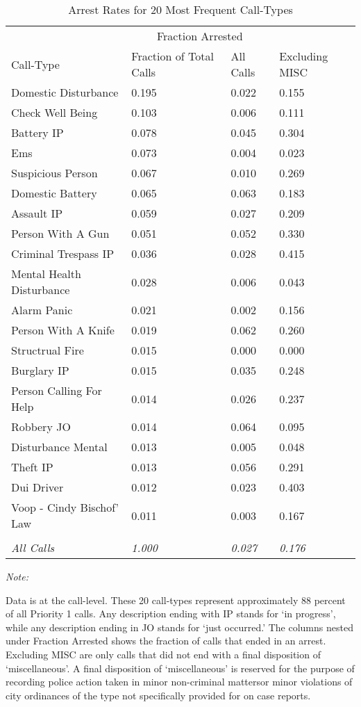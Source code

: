 \begin{table}
\centering
\caption{\label{referee_arrest_rates}Arrest Rates for 20 Most Frequent Call-Types}
\centering
\begin{threeparttable}
\begin{tabular}[t]{>{\raggedright\arraybackslash}p{6cm}lll}
\toprule
\multicolumn{2}{c}{ } & \multicolumn{2}{c}{Fraction Arrested} \\
\cmidrule(l{3pt}r{3pt}){3-4}
Call-Type & Fraction of Total Calls & All Calls & Excluding MISC\\
\midrule
Domestic Disturbance & 0.195 & 0.022 & 0.155\\
Check Well Being & 0.103 & 0.006 & 0.111\\
Battery IP & 0.078 & 0.045 & 0.304\\
Ems & 0.073 & 0.004 & 0.023\\
Suspicious Person & 0.067 & 0.010 & 0.269\\
Domestic Battery & 0.065 & 0.063 & 0.183\\
Assault IP & 0.059 & 0.027 & 0.209\\
Person With A Gun & 0.051 & 0.052 & 0.330\\
Criminal Trespass IP & 0.036 & 0.028 & 0.415\\
Mental Health Disturbance & 0.028 & 0.006 & 0.043\\
Alarm Panic & 0.021 & 0.002 & 0.156\\
Person With A Knife & 0.019 & 0.062 & 0.260\\
Structrual Fire & 0.015 & 0.000 & 0.000\\
Burglary IP & 0.015 & 0.035 & 0.248\\
Person Calling For Help & 0.014 & 0.026 & 0.237\\
Robbery JO & 0.014 & 0.064 & 0.095\\
Disturbance Mental & 0.013 & 0.005 & 0.048\\
Theft IP & 0.013 & 0.056 & 0.291\\
Dui Driver & 0.012 & 0.023 & 0.403\\
Voop - Cindy Bischof' Law & 0.011 & 0.003 & 0.167\\
\midrule\\
\em{All Calls} & \em{1.000} & \em{0.027} & \em{0.176}\\
\bottomrule
\end{tabular}
\begin{tablenotes}
\item \textit{Note: } 
\item Data is at         the call-level. These 20 call-types represent approximately 88 percent of all Priority 1 calls.         Any description         ending with IP stands for `in progress', while any description ending in JO          stands for `just occurred.' The columns nested under Fraction Arrested shows the          fraction of calls that ended in an arrest. Excluding MISC are only calls          that did not end with a final disposition of `miscellaneous'. A final disposition of         `miscellaneous' is reserved for the purpose of recording police action taken in minor non-criminal mattersor minor violations of city ordinances of the type not specifically provided for on case reports.                  

\end{tablenotes}
\end{threeparttable}
\end{table}
